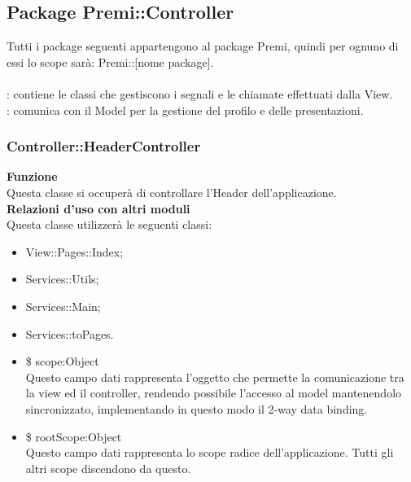 \subsection{Package Premi::Controller}{
\label{sec:controller}
Tutti i package seguenti appartengono al package Premi, quindi per ognuno di essi lo scope sarà: Premi::[nome package].\\\\
\textbf{\tipo}: contiene le classi che gestiscono i segnali e le chiamate effettuati dalla View.\\
\textbf{\relaz}: comunica con il Model per la gestione del profilo e delle presentazioni.\\

\subsubsection{Controller::HeaderController}
	\label{sub:HeaderController}
	\textbf{Funzione}\\
	\indent Questa classe si occuperà di controllare l'Header dell'applicazione.\\
	\textbf{Relazioni d'uso con altri moduli}\\
	\indent Questa classe utilizzerà le seguenti classi:
	\begin{itemize}
		\item View::Pages::Index;
		\item Services::Utils;
		\item Services::Main;
		\item Services::toPages.
		\item \$ scope:Object\\
			\indent Questo campo dati rappresenta l’oggetto che permette la comunicazione tra la view ed il controller, rendendo possibile l’accesso al model mantenendolo sincronizzato, implementando in questo modo il 2-way data binding.
		\item \$ rootScope:Object\\
			\indent Questo campo dati rappresenta lo scope radice dell’applicazione. Tutti gli altri scope discendono da questo.
	\end{itemize}

}
